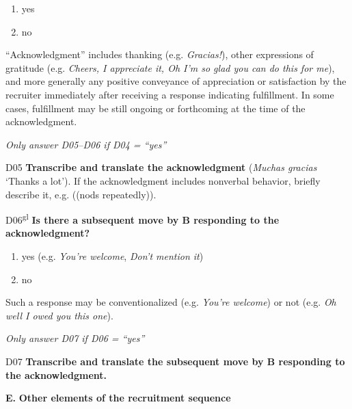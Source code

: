 \documentclass[output=paper]{langsci/langscibook}
\begin{document}
\begin{description}
\begin{enumerate}
\item {yes}
\item {no}
\end{enumerate}

“Acknowledgment” includes thanking (e.g. \textit{Gracias!}), other expressions of gratitude (e.g. \textit{Cheers, I appreciate it, Oh I’m so glad you can do this for me}), and more generally any positive conveyance of appreciation or satisfaction by the recruiter immediately after receiving a response indicating fulfillment. In some cases, fulfillment may be still ongoing or forthcoming at the time of the acknowledgment.

\smallskip

\item
\textit{Only answer D05--D06 if D04 = “yes”}

\item
D05  \textbf{Transcribe and translate the acknowledgment} (\textit{Muchas gracias} ‘Thanks a lot’). If the acknowledgment includes nonverbal behavior, briefly describe it, e.g. ((nods repeatedly)).

\item
D06\textsuperscript{gl}  \textbf{Is there a subsequent move by B responding to the acknowledgment?}

\largerpage
\begin{enumerate}
\item{yes} (e.g. \textit{You’re welcome}, \textit{Don't mention it})
\item  {no}
\end{enumerate}

Such a response may be conventionalized (e.g. \textit{You’re welcome}) or not (e.g. \textit{Oh well I owed you this one}).

\smallskip

\item
\textit{Only answer D07 if D06 = “yes”}

\item
D07  \textbf{Transcribe and translate the subsequent move by B responding to the acknowledgment.}
\end{description}

\noindent \textbf{E.} \textbf{Other elements of the recruitment sequence}

\medskip
\end{document}

